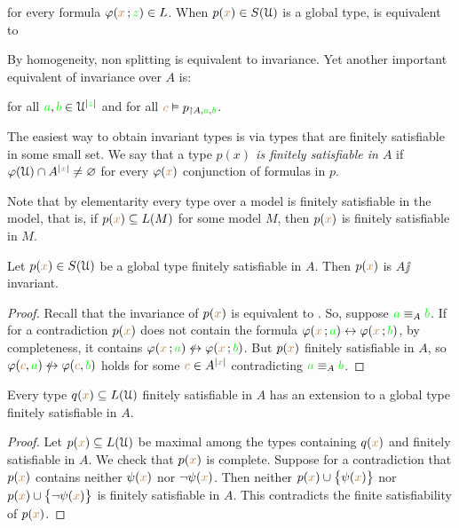 \documentclass[creche.tex]{subfiles}
\begin{document}
for every formula $\varphi({\color{brown} x}\,;{\color{green} z})\in L$. When $p({\color{brown} x})\in S(\EuScript U)$ is a global type,  is equivalent to


By homogeneity, non splitting is equivalent to invariance. Yet another important equivalent of invariance over $A$ is:

\hfill for all ${\color{green} a},{\color{green} b}\in\EuScript U^{|{\color{green} z}|}$ and for all ${\color{brown} c}\vDash p_{\restriction A,{\color{green} a},{\color{green} b}}$. 



The easiest way to obtain invariant types is via types that are finitely satisfiable in some small set. We say that a type \emph{$p(x)$ is finitely satisfiable in $A$\/} if $\varphi(\EuScript U)\cap A^{|{\color{brown} x}|}\neq\varnothing$ for every $\varphi({\color{brown} x})$ conjunction of formulas in $p$. 

Note that by elementarity every type over a model is finitely satisfiable in the model, that is, if $p({\color{brown} x})\subseteq L(M)$ for some model $M$, then $p({\color{brown} x})$ is finitely satisfiable in $M$.


\begin{proposition}\label{prop_coeredi_invarienti}
Let $p({\color{brown} x})\in S(\EuScript U)$ be a global type finitely satisfiable in $A$. Then $p({\color{brown} x})$ is $A\jj$in\-vari\-ant.
\end{proposition}

\begin{proof}
Recall that the invariance of $p({\color{brown} x})$ is equivalent to . So, suppose ${\color{green} a}\equiv_A{\color{green} b}$. If for a contradiction $p({\color{brown} x})$ does not contain the formula $\varphi({\color{brown} x}\,;{\color{green} a})\leftrightarrow\varphi({\color{brown} x}\,;{\color{green} b})$, by completeness, it contains  $\phi({\mr x}\,;{\gr a})\niff\phi({\mr x}\,;{\gr b})$. But $p({\color{brown} x})$ finitely satisfiable in $A$, so $\phi({\mr c},{\gr a})\niff\phi({\mr c},{\gr b})$ holds for some ${\color{brown} c}\in A^{|{\color{brown} x}|}$ contradicting ${\color{green} a}\equiv_A{\color{green} b}$.
\end{proof}


\begin{proposition}\label{prop_exisntence_coheirs}
Every type $q({\color{brown} x})\subseteq L(\EuScript U)$ finitely satisfiable in $A$ has an extension to a global type finitely satisfiable in $A$.
\end{proposition}

\begin{proof} 
Let $p({\color{brown} x})\subseteq L(\EuScript U)$ be maximal among the types containing $q({\color{brown} x})$ and finitely satisfiable in $A$. We check that $p({\color{brown} x})$ is complete. Suppose for a contradiction that $p({\color{brown} x})$ contains neither $\psi({\color{brown} x})$ nor $\neg\psi({\color{brown} x})$. Then  neither $p({\color{brown} x})\cup\big\{\psi({\color{brown} x})\big\}$ nor $p({\color{brown} x})\cup\big\{\neg\psi({\color{brown} x})\big\}$ is finitely satisfiable in $A$. This contradicts the finite satisfiability of $p({\color{brown} x})$.
\end{proof}
\end{document}
